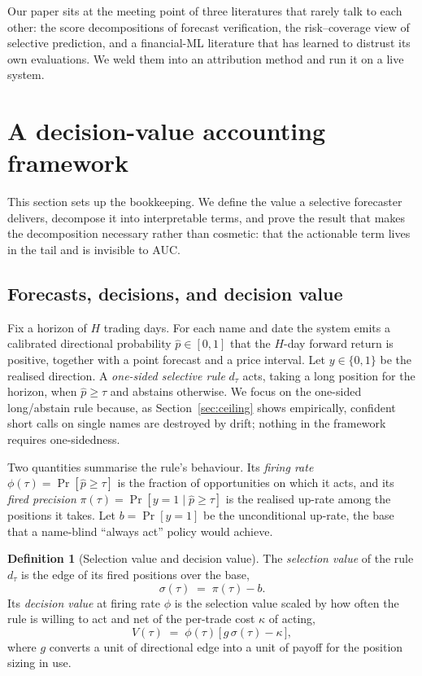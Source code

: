 \documentclass[10pt, a4paper, oneside]{article}
\theoremstyle{definition}
\newtheorem{definition}{Definition}
\theoremstyle{plain}
\newcommand{\Pup}{\hat p}
\begin{document}
Our paper sits at the meeting point of three literatures that rarely talk to each
other: the score decompositions of forecast verification, the risk--coverage view
of selective prediction, and a financial-ML literature that has learned to distrust
its own evaluations. We weld them into an attribution method and run it on a live
system.

\section{A decision-value accounting framework}
\label{sec:framework}
This section sets up the bookkeeping. We define the value a selective forecaster
delivers, decompose it into interpretable terms, and prove the result that makes the
decomposition necessary rather than cosmetic: that the actionable term lives in the
tail and is invisible to AUC.

\subsection{Forecasts, decisions, and decision value}
\label{sec:defs}
Fix a horizon of $H$ trading days. For each name and date the system emits a
calibrated directional probability $\Pup\in[0,1]$ that the $H$-day forward return is
positive, together with a point forecast and a price interval. Let $y\in\{0,1\}$ be
the realised direction. A \emph{one-sided selective rule} $d_\tau$ acts, taking a long
position for the horizon, when $\Pup\ge\tau$ and abstains otherwise. We focus on the
one-sided long/abstain rule because, as Section~\ref{sec:ceiling} shows empirically,
confident short calls on single names are destroyed by drift; nothing in the
framework requires one-sidedness.

Two quantities summarise the rule's behaviour. Its \emph{firing rate}
$\phi(\tau)=\Pr[\Pup\ge\tau]$ is the fraction of opportunities on which it acts, and
its \emph{fired precision} $\pi(\tau)=\Pr[y=1\mid \Pup\ge\tau]$ is the realised up-rate
among the positions it takes. Let $b=\Pr[y=1]$ be the unconditional up-rate, the
base that a name-blind ``always act'' policy would achieve.

\begin{definition}[Selection value and decision value]
\label{def:dv}
The \emph{selection value} of the rule $d_\tau$ is the edge of its fired positions
over the base,
\begin{equation}
\label{eq:sigma}
\sigma(\tau)\;=\;\pi(\tau)-b .
\end{equation}
Its \emph{decision value} at firing rate $\phi$ is the selection value scaled by how
often the rule is willing to act and net of the per-trade cost $\kappa$ of acting,
\begin{equation}
\label{eq:dv}
V(\tau)\;=\;\phi(\tau)\,\big[\,g\,\sigma(\tau)-\kappa\,\big],
\end{equation}
where $g$ converts a unit of directional edge into a unit of payoff for the position
sizing in use.
\end{definition}
\end{document}

